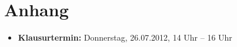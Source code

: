 \chapter*{Anhang}
\begin{itemize}
 \item \textbf{Klausurtermin:} Donnerstag, 26.07.2012, 14 Uhr – 16 Uhr
\end{itemize}
